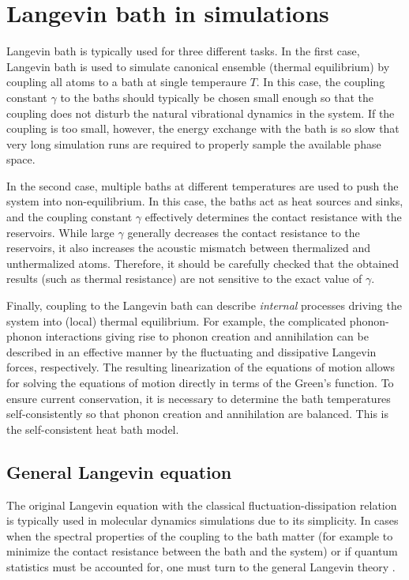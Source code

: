 \section{Langevin bath in simulations}

Langevin bath is typically used for three different tasks. In the first case, Langevin bath is used to simulate canonical ensemble (thermal equilibrium) by coupling all atoms to a bath at single temperaure $T$. In this case, the coupling constant $\gamma$ to the baths should typically be chosen small enough so that the coupling does not disturb the natural vibrational dynamics in the system. If the coupling is too small, however, the energy exchange with the bath is so slow that very long simulation runs are required to properly sample the available phase space.

In the second case, multiple baths at different temperatures are used to push the system into non-equilibrium. In this case, the baths act as heat sources and sinks, and the coupling constant $\gamma$ effectively determines the contact resistance with the reservoirs. While large $\gamma$ generally decreases the contact resistance to the reservoirs, it also increases the acoustic mismatch between thermalized and unthermalized atoms. Therefore, it should be carefully checked that the obtained results (such as thermal resistance) are not sensitive to the exact value of $\gamma$.

Finally, coupling to the Langevin bath can describe \textit{internal} processes driving the system into (local) thermal equilibrium. For example, the complicated phonon-phonon interactions giving rise to phonon creation and annihilation can be described in an effective manner by the fluctuating and dissipative Langevin forces, respectively. The resulting linearization of the equations of motion allows for solving the equations of motion directly in terms of the Green's function. To ensure current conservation, it is necessary to determine the bath temperatures self-consistently so that phonon creation and annihilation are balanced. This is the self-consistent heat bath model.
\fi

\iffalse
\subsection{General Langevin equation}

The original Langevin equation with the classical fluctuation-dissipation relation is typically used in molecular dynamics simulations due to its simplicity. In cases when the spectral properties of the coupling to the bath matter (for example to minimize the contact resistance between the bath and the system) or if quantum statistics must be accounted for, one must turn to the general Langevin theory \cite{weiss}.

